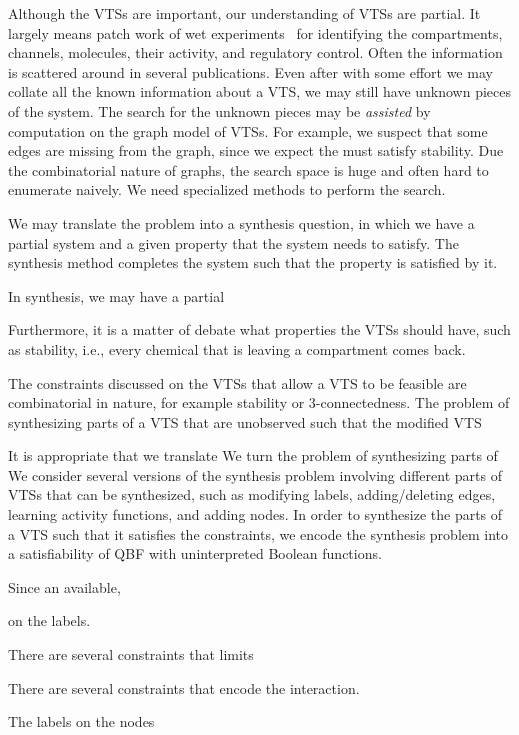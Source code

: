 %
Although the VTSs are important, our understanding of VTSs are partial.
%
It largely means patch work of wet experiments~\cite{model} for
identifying the compartments, channels, molecules, their activity, and
regulatory control.
%
Often the information is scattered around in several publications.
%
Even after with some effort we may collate all the known information about
a VTS, we may still have unknown pieces of the system.
%
The search for the unknown pieces may be {\em assisted} by computation on
the graph model of VTSs.
%
For example, we suspect that some edges are missing from the graph, since
we expect the must satisfy stability.
%
Due the combinatorial nature of graphs, the search space is huge and often
hard to enumerate naively.
%
We need specialized methods to perform the search.

%
We may translate the problem into a synthesis question, in which 
we have a partial system  and a given property that
the system needs to satisfy.
%
The synthesis method completes the system such that the property
is satisfied by it.
%


In synthesis, we may have a partial

Furthermore, it is a matter of debate what properties the VTSs should
have, such as stability, i.e., every chemical that is leaving a
compartment comes back.



The constraints discussed on the VTSs that allow a VTS to be feasible
are combinatorial in nature, for example stability or 3-connectedness.
%
The problem of synthesizing parts of a VTS that are unobserved such that 
the modified VTS 

It is appropriate that we translate 
We turn the problem of synthesizing parts of 
%
We consider several versions of the synthesis problem involving different
parts of VTSs that can be synthesized, such as modifying labels,
adding/deleting edges, learning activity functions, and adding nodes.
%
In order to synthesize the parts of a VTS such that it satisfies the
constraints, we encode the synthesis problem into a satisfiability of
QBF with uninterpreted Boolean functions. 


Since an available, 

on the labels.


There are several constraints that limits 

There are several constraints that encode the interaction.


The labels on the nodes 




